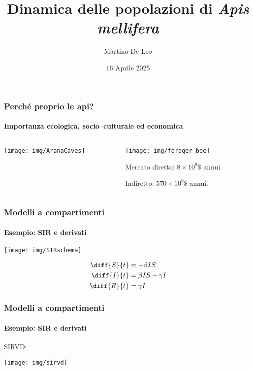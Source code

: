 \documentclass[]{beamer} %
\title[Modelli per \emph{A.~mellifera}]{Dinamica delle popolazioni di \emph{Apis mellifera}}
\author[]{Martino De Leo}
\date{16 Aprile 2025}
\begin{document}
\begin{frame}
    \maketitle
\end{frame}


\begin{frame}
    \frametitle{Perché proprio le api?}
    \framesubtitle{Importanza ecologica, socio--culturale ed economica}

    \begin{columns}
        \begin{column}{0.45\textwidth}
            \texttt{[image: img/AranaCaves]}
        \end{column}
        \pause
        \begin{column}{0.45\textwidth}
            \texttt{[image: img/forager\_bee]}

            Mercato diretto: $8 \times 10^9 \$$ annui.

            \pause
            Indiretto: $570 \times 10^9 \$$ annui.
        \end{column}
    \end{columns}
\end{frame}


\begin{frame}
    \frametitle{Modelli a compartimenti}
    \framesubtitle{Esempio: SIR e derivati}

    \begin{center}
        \texttt{[image: img/SIRschema]}
    \end{center}

    \pause
    \begin{align*}
    \diff{S}{t} &= - \beta I S \\
    \diff{I}{t} &= \beta I S - \gamma I \\
    \diff{R}{t} &= \gamma I
    \end{align*}
\end{frame}

\begin{frame}
    \frametitle{Modelli a compartimenti}
    \framesubtitle{Esempio: SIR e derivati}

    SIRVD:
    \pause
    \begin{center}
        \texttt{[image: img/sirvd]}
    \end{center}
\end{frame}
\end{document}
